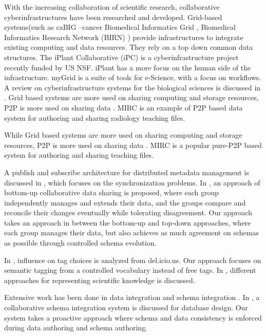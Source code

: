 \documentclass{singlecol-new}
\theoremstyle{TH}{
\newtheorem{lemma}{Lemma}
\newtheorem{theorem}[lemma]{Theorem}
\newtheorem{corrolary}[lemma]{Corrolary}
\newtheorem{conjecture}[lemma]{Conjecture}
\newtheorem{proposition}[lemma]{Proposition}
\newtheorem{claim}[lemma]{Claim}
\newtheorem{stheorem}[lemma]{Wrong Theorem}
\newtheorem{algorithm}{Algorithm}
}
\theoremstyle{THrm}{
\newtheorem{definition}{Definition}[section]
\newtheorem{question}{Question}[section]
\newtheorem{remark}{Remark}
\newtheorem{scheme}{Scheme}
}
\theoremstyle{THhit}{
\newtheorem{case}{Case}[section]
}
\begin{document}
With the increasing collaboration of scientific research,
collaborative cyberinfrastructures have been researched and
developed.  Grid-based systems(such as caBIG{\small \textregistered}
--cancer Biomedical Informatics Grid \cite{cabig}, Biomedical
Informatics Research Network (BIRN) \cite{birn}) provide
infrastructures to integrate existing computing and data resources.
They rely on a top down common data structures. The iPlant
Collaborative (iPC) \cite{pscic}  is a cyberinfrastructure project
recently funded by US NSF. iPlant has a more focus on the human side
of the infrastructure. myGrid \cite{mygrid} is a suite of tools for
e-Science, with a focus on workflows.   A review on
cyberinfrastructure systems for the biological sciences  is
discussed in \cite{stein08}.  Grid based systems are more used on
sharing computing and storage resources, P2P is more used on sharing
data \cite{foster03p2p2grid}.  MIRC \cite{mirc} is an example of P2P
based data system for authoring and sharing radiology  teaching
files.

While Grid based systems are more used on sharing computing and storage
resources, P2P is more used on sharing data \cite{foster03p2p2grid}.  MIRC
\cite{mirc} is a popular pure-P2P based system for authoring and sharing
teaching files.

A publish and subscribe architecture for distributed metadata management is
discussed in \cite{keidl02metadata}, which focuses on the synchronization
problems. In \cite{taylor06reconcile}, an approach of bottom-up collaborative
data sharing is proposed, where each group independently manages and extends
their data, and  the groups compare and reconcile their changes eventually
while tolerating disagreement. Our approach takes an approach in between the
bottom-up and top-down approaches, where each group manages their data, but
also achieves as much agreement on schemas as possible through controlled
schema evolution.


In \cite{rader08tag}, influence on tag choices is analyzed from
del.icio.us. Our approach focuses on semantic tagging from a
controlled vocabulary instead of free tags.  In \cite{pike07},
different approaches for representing scientific knowledge is
discussed.


Extensive work has been done in data integration and schema
integration \cite{halevy06integration,doan05semantic}. In
\cite{beynon97}, a collaborative schema integration system is
discussed for database design. Our system takes a proactive approach
where schema and data consistency is enforced during data authoring
and schema authoring.
\end{document}
